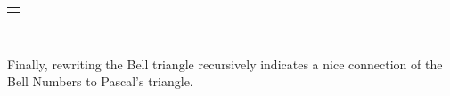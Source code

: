 \documentclass[10pt,]{book}
\theoremstyle{plain}
\theoremstyle{definition}
\theoremstyle{definition}
\numberwithin{equation}{chapter}
\newlength{\panelmax}
\begin{document}
{%
\setlength{\panelmax}{0pt}
\ifdefined\panelboxAtabular\else\newsavebox{\panelboxAtabular}\fi%
\ifdefined\phAtabular\else\newlength{\phAtabular}\fi%
\setlength{\phAtabular}{\ht\panelboxAtabular+\dp\panelboxAtabular}
\settototalheight{\phAtabular}{\usebox{\panelboxAtabular}}
\setlength{\panelmax}{\maxof{\panelmax}{\phAtabular}}
\leavevmode%
\setlength{\tabcolsep}{0\linewidth}
\par\medskip\noindent
\hspace*{0.1\linewidth}%
\begin{tabular}{@{}*{1}{c}@{}}
\begin{minipage}[c][\panelmax][t]{0.8\linewidth}\usebox{\panelboxAtabular}\end{minipage}\end{tabular}\\
}%
\par
\hypertarget{p-159}{}%
Finally, rewriting the Bell triangle recursively indicates a nice connection of the Bell Numbers to Pascal's triangle.%
\end{document}
